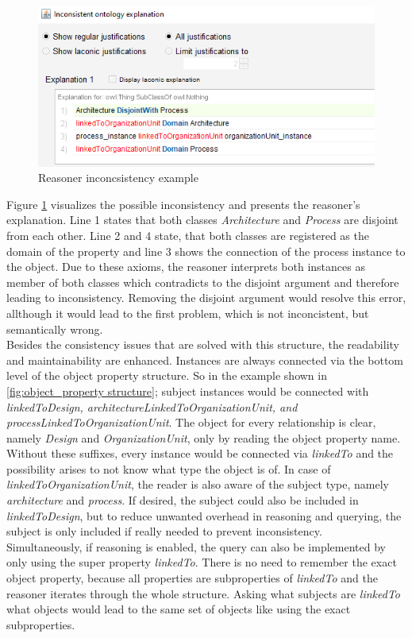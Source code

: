\documentclass[
  a4paper,  %
  twoside,  %
  bibliography=totoc,
  headsepline,
  cleardoublepage=empty,
  parskip=half,
  draft=false
]{scrbook}
\begin{document}
\begin{figure}
  \centering
  \includegraphics[width=\textwidth]{graphics/inconsistent.PNG}
  \caption{Reasoner inconcsistency example}
  \label{fig:inconsistent}
\end{figure}

Figure \ref{fig:inconsistent} visualizes the possible inconsistency and presents the reasoner's explanation. Line 1 states that both classes \textit{Architecture} and \textit{Process} are disjoint from each other. Line 2 and 4 state, that both classes are registered as the domain of the property and line 3 shows the connection of the process instance to the object. Due to these axioms, the reasoner interprets both instances as member of both classes which contradicts to the disjoint argument and therefore leading to inconsistency. Removing the disjoint argument would resolve this error, allthough it would lead to the first problem, which is not inconcistent, but semantically wrong.\\

Besides the consistency issues that are solved with this structure, the readability and maintainability are enhanced. Instances are always connected via the bottom level of the object property structure. So in the example shown in \ref{fig:object_property structure}; subject instances would be connected with \textit{linkedToDesign, architectureLinkedToOrganizationUnit, and processLinkedToOrganizationUnit}. The object for every relationship is clear, namely \textit{Design} and \textit{OrganizationUnit}, only by reading the object property name. Without these suffixes, every instance would be connected via \textit{linkedTo} and the possibility arises to not know what type the object is of. In case of \textit{linkedToOrganizationUnit}, the reader is also aware of the subject type, namely \textit{architecture} and \textit{process}. If desired, the subject could also be included in \textit{linkedToDesign}, but to reduce unwanted overhead in reasoning and querying, the subject is only included if really needed to prevent inconsistency.\\
Simultaneously, if reasoning is enabled, the query can also be implemented by only using the super property \textit{linkedTo}. There is no need to remember the exact object property, because all properties are subproperties of \textit{linkedTo} and the reasoner iterates through the whole structure. Asking what subjects are \textit{linkedTo} what objects would lead to the same set of objects like using the exact subproperties.\\
\end{document}
